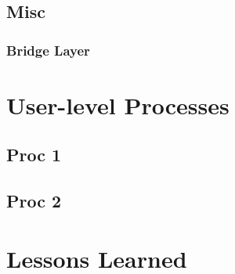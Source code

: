 \documentclass[12pt]{report}
\begin{document}
\chapter{Misc}

\section{Bridge Layer}

\part{User-level Processes}

\chapter{Proc 1}

\chapter{Proc 2}

\part{Lessons Learned}
\end{document}
